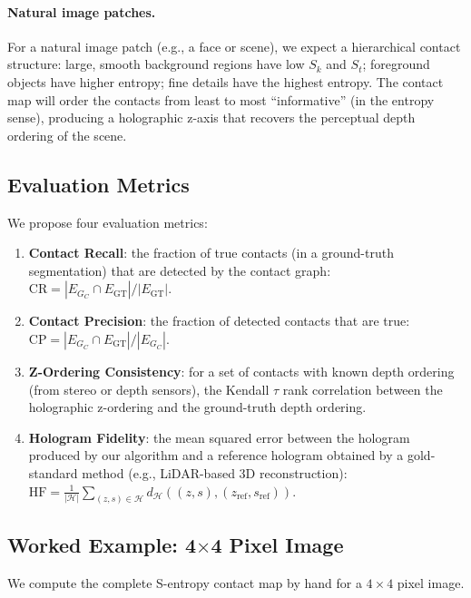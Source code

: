 \documentclass[twocolumn]{article}
\theoremstyle{plain}
\theoremstyle{definition}
\newcommand{\HH}{\mathcal{H}}
\newcommand{\Sk}{S_k}
\newcommand{\St}{S_t}
\begin{document}
\paragraph{Natural image patches.} For a natural image patch (e.g., a face or
scene), we expect a hierarchical contact structure: large, smooth background
regions have low $\Sk$ and $\St$; foreground objects have higher entropy; fine
details have the highest entropy. The contact map will order the contacts
from least to most ``informative'' (in the entropy sense), producing a holographic
z-axis that recovers the perceptual depth ordering of the scene.

\subsection{Evaluation Metrics}

We propose four evaluation metrics:

\begin{enumerate}[label=(\alph*)]
\item \textbf{Contact Recall}: the fraction of true contacts (in a ground-truth
  segmentation) that are detected by the contact graph:
  $\text{CR} = |E_{G_C} \cap E_{\text{GT}}| / |E_{\text{GT}}|$.

\item \textbf{Contact Precision}: the fraction of detected contacts that are true:
  $\text{CP} = |E_{G_C} \cap E_{\text{GT}}| / |E_{G_C}|$.

\item \textbf{Z-Ordering Consistency}: for a set of contacts with known depth ordering
  (from stereo or depth sensors), the Kendall $\tau$ rank correlation between
  the holographic z-ordering and the ground-truth depth ordering.

\item \textbf{Hologram Fidelity}: the mean squared error between the hologram
  produced by our algorithm and a reference hologram obtained by a gold-standard
  method (e.g., LiDAR-based 3D reconstruction):
  $\text{HF} = \frac{1}{|\HH|} \sum_{(z,s) \in \HH} d_{\HH}((z,s), (z_{\text{ref}},s_{\text{ref}}))$.
\end{enumerate}

\subsection{Worked Example: 4$\times$4 Pixel Image}

We compute the complete S-entropy contact map by hand for a $4 \times 4$ pixel
image.
\end{document}

